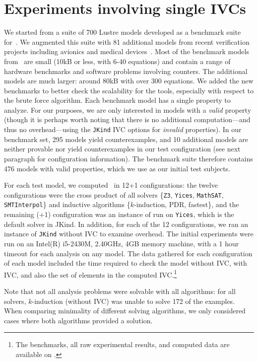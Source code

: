 \section{Experiments involving single IVCs}
\label{sec:exprinit}
We started from a suite of 700 Lustre models developed
as a benchmark suite for~\cite{Hagen08:FMCAD}. We augmented this suite
with 81 additional models from recent verification projects including
avionics and medical devices~\cite{QFCS15:backes,hilt2013}. Most of
the benchmark models from~\cite{Hagen08:FMCAD} are small (10kB or less,
with 6-40 equations) and contain a range of hardware benchmarks and
software problems involving counters. The additional models are much
larger: around 80kB with over 300 equations. We added the new
benchmarks to better check the scalability for the tools, especially
with respect to the brute force algorithm.
%
Each benchmark model has a single property to analyze.  For our purposes, we are only interested in models with a {\em valid} property (though it is perhaps worth noting that there is no additional computation---and thus no overhead---using the \texttt{JKind} IVC options for {\em invalid} properties).  In our benchmark set, 295 models yield counterexamples, and 10 additional models are neither provable nor yield counterexamples in our test configuration (see next paragraph for configuration information).  The benchmark suite therefore contains 476 models with valid properties, which we use as our initial test subjects.

For each test model, we computed \ucalg\ in 12+1 configurations: the
twelve configurations were the cross product of all solvers \{\texttt{Z3},
\texttt{Yices}, \texttt{MathSAT}, \texttt{SMTInterpol}\} and inductive algorithms
\{$k$-induction, PDR, fastest\}, and the remaining (+1) configuration
was an instance of \bfalg run on \texttt{Yices}, which is the default solver in
JKind.
 In addition, for each of the 12 configurations, we ran an
instance of \texttt{JKind} without IVC to examine overhead. The initial experiments
were run on an Intel(R) i5-2430M, 2.40GHz, 4GB memory machine, with a
1 hour timeout for each analysis on any model. The data gathered for
each configuration of each model included the time required to check
the model without IVC, with IVC, and also the set of elements in the
computed IVC.\footnote{The benchmarks, all raw experimental results,
  and computed data are available on \cite{expr}.}

Note that not all analysis problems were solvable with all algorithms: for all solvers, $k$-induction (without IVC) was unable to solve 172 of the examples.  When comparing minimality of different solving algorithms, we only considered cases where both algorithms provided a solution.


